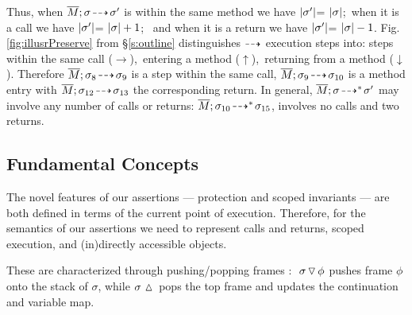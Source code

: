{Thus, when $\overline{M};\sigma\! \dashrightarrow\! {\sigma'} $ is within the same method we have  $|\sigma'|$= $|\sigma|$;\  when it is a call we have
 $|\sigma'|$= $|\sigma|+1$; \ and when it is a return we have  $|\sigma'|$= $|\sigma|-1$.}
Fig. \ref{fig:illusrPreserve}  from \S \ref{s:outline} %
distinguishes %
  ${\dashrightarrow}$ {execution} steps into: %
steps within the same  call ($\rightarrow$),\   entering a method  ($\uparrow$),\    returning from a method  ($\downarrow$).
Therefore $\overline{M};\sigma_8\! \dashrightarrow\! {\sigma_9} $ is a step within the same call, 
$\overline{M};\sigma_9\! \dashrightarrow\! {\sigma_{10}} $ is a method entry with $\overline{M};\sigma_{12}\! \dashrightarrow\! {\sigma_{13}} $
the corresponding return. 
In general,  $\overline{M};\sigma\! \dashrightarrow^*\! {\sigma'}$ may involve {any}  number of  calls or returns: \eg
$\overline{M};\sigma_{10}\! \dashrightarrow^*\! {\sigma_{15}}$,   involves no calls and two returns.


%
 

\subsection{Fundamental  Concepts}
\label{s:auxiliary}

The novel features of our assertions — protection and scoped invariants  
— are both defined in terms of the current point of execution.
Therefore, for the semantics of our   assertions we need to represent calls and returns, scoped execution, and (in)directly accessible objects.
 
  These  are characterized through pushing/popping   frames :
$  \ {\sigma} \, {\triangledown}\, {\phi} $ pushes 
frame $\phi$ onto the stack of $\sigma$, while
${\sigma\, \, {\vartriangle}\,}$   pops the top frame %
and updates the continuation and variable map.

